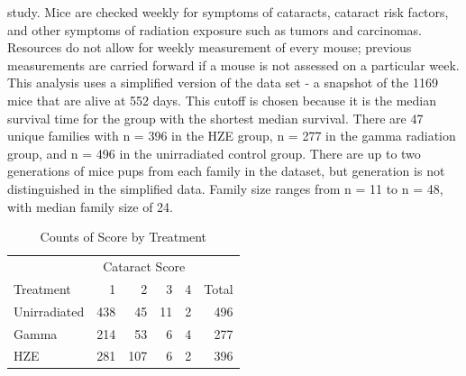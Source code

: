 \documentclass[
]{article}
\begin{document}
study. Mice are checked weekly for symptoms of cataracts, cataract risk
factors, and other symptoms of radiation exposure such as tumors and
carcinomas. Resources do not allow for weekly measurement of every
mouse; previous measurements are carried forward if a mouse is not
assessed on a particular week. This analysis uses a simplified version
of the data set - a snapshot of the 1169 mice that are alive at 552
days. This cutoff is chosen because it is the median survival time for
the group with the shortest median survival. There are 47 unique
families with n = 396 in the HZE group, n = 277 in the gamma radiation
group, and n = 496 in the unirradiated control group. There are up to
two generations of mice pups from each family in the dataset, but
generation is not distinguished in the simplified data. Family size
ranges from n = 11 to n = 48, with median family size of 24.

\begin{table}

\caption{\label{tab:scoregrps}Counts of Score by Treatment}
\centering
\fontsize{12}{14}\selectfont
\begin{tabular}[t]{l|r|r|r|r|r}
\hline
\multicolumn{1}{c|}{ } & \multicolumn{4}{c|}{Cataract Score} & \multicolumn{1}{c}{ } \\
\cline{2-5}
Treatment & 1 & 2 & 3 & 4 & Total\\
\hline
Unirradiated & 438 & 45 & 11 & 2 & 496\\
\hline
Gamma & 214 & 53 & 6 & 4 & 277\\
\hline
HZE & 281 & 107 & 6 & 2 & 396\\
\hline
\end{tabular}
\end{table}
\end{document}
